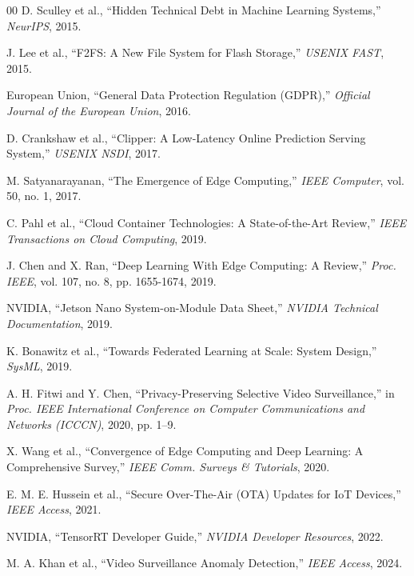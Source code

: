 \documentclass[conference]{IEEEtran}
\begin{document}
\begin{thebibliography}{00}
 D. Sculley et al., ``Hidden Technical Debt in Machine Learning Systems,'' \textit{NeurIPS}, 2015.


 J. Lee et al., ``F2FS: A New File System for Flash Storage,'' \textit{USENIX FAST}, 2015.

 European Union, ``General Data Protection Regulation (GDPR),'' \textit{Official Journal of the European Union}, 2016.

 D. Crankshaw et al., ``Clipper: A Low-Latency Online Prediction Serving System,'' \textit{USENIX NSDI}, 2017.

 M. Satyanarayanan, ``The Emergence of Edge Computing,'' \textit{IEEE Computer}, vol. 50, no. 1, 2017.


 C. Pahl et al., ``Cloud Container Technologies: A State-of-the-Art Review,'' \textit{IEEE Transactions on Cloud Computing}, 2019.

 J. Chen and X. Ran, ``Deep Learning With Edge Computing: A Review,'' \textit{Proc. IEEE}, vol. 107, no. 8, pp. 1655-1674, 2019.

 NVIDIA, ``Jetson Nano System-on-Module Data Sheet,'' \textit{NVIDIA Technical Documentation}, 2019.

 K. Bonawitz et al., ``Towards Federated Learning at Scale: System Design,'' \textit{SysML}, 2019.

 A. H. Fitwi and Y. Chen, ``Privacy-Preserving Selective Video Surveillance,'' in \textit{Proc. IEEE International Conference on Computer Communications and Networks (ICCCN)}, 2020, pp. 1--9.

 X. Wang et al., ``Convergence of Edge Computing and Deep Learning: A Comprehensive Survey,'' \textit{IEEE Comm. Surveys \& Tutorials}, 2020.

 E. M. E. Hussein et al., ``Secure Over-The-Air (OTA) Updates for IoT Devices,'' \textit{IEEE Access}, 2021.

 NVIDIA, ``TensorRT Developer Guide,'' \textit{NVIDIA Developer Resources}, 2022.

 M. A. Khan et al., ``Video Surveillance Anomaly Detection,'' \textit{IEEE Access}, 2024.

\end{thebibliography}
\end{document}
